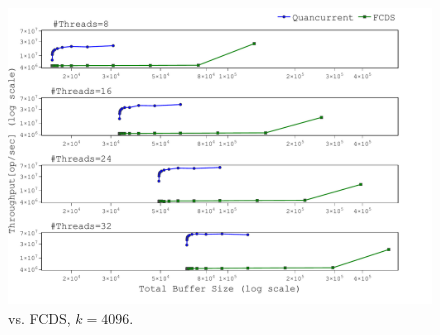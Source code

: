 
\begin{figure}[h]
\includegraphics[width=\textwidth,trim={0cm 0cm 0cm 0cm},clip]
{graphics/graphs/FCDS/oracle_Quancurrent_vs_FCDS_block_numa_up_k4096_keys10M_T8-32_runs15_equal_relax_log_largeB_rm_last2_diff_axes_name_16-09-2022_18-59-50.pdf}
\caption{\mysketch vs. FCDS, $k=4096$.}
\label{fig:compare_FCDS_k4096}
\end{figure}
